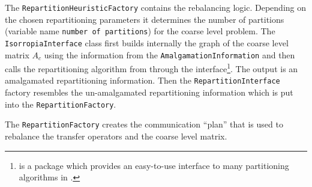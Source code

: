 \documentclass[10pt,fleqn]{book}
\begin{document}
The \verb|RepartitionHeuristicFactory| contains the rebalancing logic. Depending on the chosen repartitioning parameters it determines the number of partitions (variable name \verb|number of partitions|) for the coarse level problem.
The \verb|IsorropiaInterface| class first builds internally the graph of the coarse level matrix $A_c$ using the information from the \verb|AmalgamationInformation| and then calls the repartitioning algorithm from \zoltan through the \isorropia interface\footnote{\isorropia is a \trilinos package which provides an easy-to-use interface to many partitioning algorithms in \zoltan.}. The output is an amalgamated repartitioning information. Then the \verb|RepartitionInterface| factory resembles the un-amalgamated repartitioning information which is put into the \verb|RepartitionFactory|.

The \verb|RepartitionFactory| creates the communication ``plan'' that is used to rebalance the transfer operators and the coarse level matrix.
\end{document}
